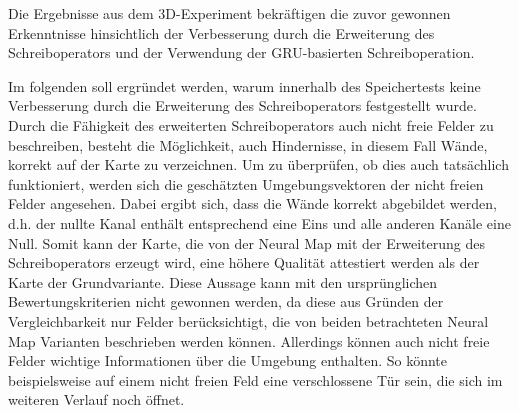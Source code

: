 Die Ergebnisse aus dem 3D-Experiment bekräftigen die zuvor gewonnen Erkenntnisse hinsichtlich der Verbesserung durch die Erweiterung des Schreiboperators und der Verwendung der GRU-basierten Schreiboperation.



Im folgenden soll ergründet werden, warum innerhalb des Speichertests keine Verbesserung durch die Erweiterung des Schreiboperators festgestellt wurde. Durch die Fähigkeit des erweiterten Schreiboperators auch nicht freie Felder zu beschreiben, besteht die Möglichkeit, auch Hindernisse, in diesem Fall Wände, korrekt auf der Karte zu verzeichnen. Um zu überprüfen, ob dies auch tatsächlich funktioniert, werden sich die geschätzten Umgebungsvektoren der nicht freien Felder angesehen. Dabei ergibt sich, dass die Wände korrekt abgebildet werden, d.h. der nullte Kanal enthält entsprechend eine Eins und alle anderen Kanäle eine Null. Somit kann der Karte, die von der Neural Map mit der Erweiterung des Schreiboperators erzeugt wird, eine höhere Qualität attestiert werden als der Karte der Grundvariante. Diese Aussage kann mit den ursprünglichen Bewertungskriterien nicht gewonnen werden, da diese aus Gründen der Vergleichbarkeit nur Felder berücksichtigt, die von beiden betrachteten Neural Map Varianten beschrieben werden können. Allerdings können auch nicht freie Felder wichtige Informationen über die Umgebung enthalten. So könnte beispielsweise auf einem nicht freien Feld eine verschlossene Tür sein, die sich im weiteren Verlauf noch öffnet.



